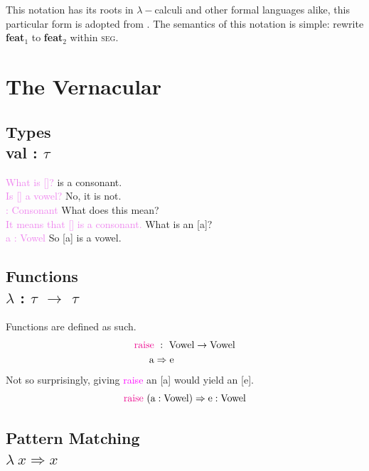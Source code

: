 \documentclass{report}[12pt]
\begin{document}
This notation has its roots in $\lambda-$calculi and other formal languages alike, this particular form is adopted from \cite{tpl}. The semantics of this notation is simple: rewrite \textbf{feat}$_1$ to \textbf{feat}$_2$ within \textsc{seg}.

\section{The Vernacular}\label{sec:vernacular}

\subsection*{Types \\ val : $\tau$}

\begin{tcolorbox}
  \textcolor{violet}{What is []?} \quad [\textipa{S}] is a consonant. \\
  \textcolor{violet}{Is [] a vowel?} \quad No, it is not. \\
  \textcolor{violet}{ : Consonant} \quad What does this mean? \\
  \textcolor{violet}{It means that [] is a consonant.} \quad What is an [a]? \\
  \textcolor{violet}{a : Vowel} \quad So [a] is a vowel. \\
\end{tcolorbox}

\subsection*{Functions \\ $\lambda$ : $\tau$ $\rightarrow$ $\tau$}

Functions are defined as such.
\begin{align*}
  \text{\textcolor{magenta}{raise}} &\ :\ \text{Vowel} \rightarrow \text{Vowel} \\
  \text{a} & \Rightarrow \text{e} \\
\end{align*}
Not so surprisingly, giving \textcolor{magenta}{raise} an [a] would yield an [e].
\[ \text{\textcolor{magenta}{raise}}\ (\text{a} : \text{Vowel}) \Rightarrow \text{e} : \text{Vowel} \]

\subsection*{Pattern Matching \\ $\lambda\ x \Rightarrow x$}
\end{document}
